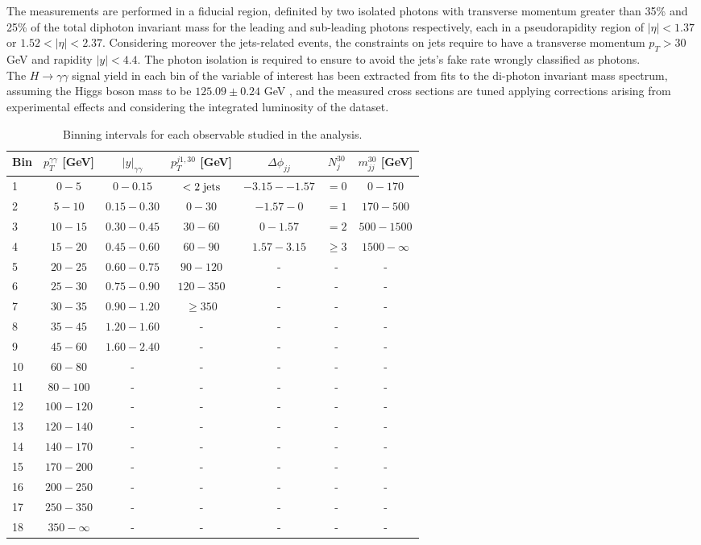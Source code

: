 \\\\
The measurements are performed in a fiducial region, definited by two isolated photons with transverse momentum greater than 35\% and 25\% of the total diphoton invariant mass for the leading and sub-leading photons respectively, each in a pseudorapidity region of $|\eta| < 1.37$ or $1.52 < |\eta| < 2.37$. Considering moreover the jets-related events, the constraints on jets require to have a transverse momentum $p_T > 30$ GeV and rapidity $|y| < 4.4$. The photon isolation is required to ensure to avoid the jets's fake rate wrongly classified as photons.
\\
The $H \rightarrow \gamma\gamma$ signal yield in each bin of the variable of interest has been extracted from fits to the di-photon invariant mass spectrum, assuming the Higgs boson mass to be $125.09 \pm 0.24$ GeV \cite{Aad_2015}, and the measured cross sections are tuned applying corrections arising from experimental effects and considering the integrated luminosity of the dataset.
\begin{table}[h]
\centering
\small
\caption{Binning intervals for each observable studied in the analysis.}
\label{binning_table}
\begin{tabular}{l | cccccc}
Bin & $p_T^{\gamma\gamma}$ [GeV] & $|y|_{\gamma\gamma}$ & $p_T^{j1, 30}$ [GeV] & $\Delta\phi_{jj}$ & $N_j^{30}$ & $m_{jj}^{30}$ [GeV] \\
\hline
1 & $0-5$ & $0-0.15$ & $<2 \hspace{0.1cm}\text{jets}$ & $-3.15--1.57$ & $= 0$ & $0-170$ \\
2 & $5-10$ & $0.15-0.30$ & $0-30$ & $-1.57-0$ & $= 1$ & $170-500$ \\
3 & $10-15$ & $0.30-0.45$ & $30-60$ & $0-1.57$ & $= 2$ & $500-1500$ \\
4 & $15-20$ & $0.45-0.60$ & $60-90$ & $1.57-3.15$ & $\geq3$ & $1500-\infty$ \\
5 & $20-25$ & $0.60-0.75$ & $90-120$ & - & - & - \\
6 & $25-30$ & $0.75-0.90$ & $120-350$ & - & - & - \\
7 & $30-35$ & $0.90-1.20$ & $\geq350$ & - & - & - \\
8 & $35-45$ & $1.20-1.60$ & - & - & - & - \\
9 & $45-60$ & $1.60-2.40$ & - & - & - & - \\
10 & $60-80$ & - & - &  - & - & - \\
11 & $80-100$ & - & - & - & - & - \\
12 & $100-120$ & - & - &  - & - & - \\
13 & $120-140$ & - & - & - & - & - \\
14 & $140-170$ & - & - & - & - & - \\
15 & $170-200$ & - & - & - & - & - \\
16 & $200-250$ & - & - & - & - & - \\
17 & $250-350$ & - & - & - & - & - \\
18 & $350-\infty$ & - & - & - & - & -
\end{tabular}
\end{table}

